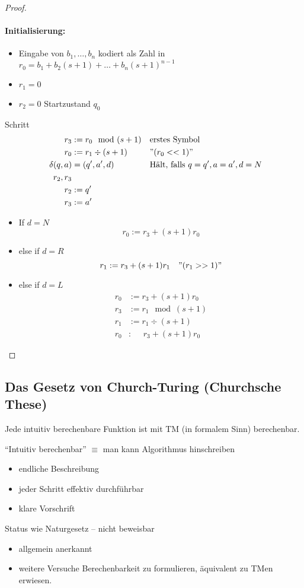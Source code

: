 \begin{proof}
	\paragraph{Initialisierung:}
	\begin{itemize}[label=\textbullet]
		\item Eingabe von $b_1,\dots,b_n$ kodiert als Zahl in $r_0=b_1+b_2(s+1)+\dots+b_n(s+1)^{n-1}$
		\item $r_1=0$
		\item $r_2=0$ Startzustand $q_0$
	\end{itemize}
	Schritt
	\begin{align*}
		r_3 &:= r_0 \mod(s+1) &&\text{erstes Symbol}\\
		r_0 &:= r_1 \div(s+1) &&"(r_0<<1)"\\
		\delta(q,a) &= (q',a',d) &&\text{Hält, falls }q=q',a=a',d=N\\
		\phantom{\delta(}r_2,r_3\\
		r_2 &:= q'\\
		r_3 &:= a'
	\end{align*}
	\begin{itemize}
		\item If $d=N$
		\[ r_0 := r_3+(s+1)r_0 \]
		\item else if $d=R$
		\[ r_1 := r_3+(s+1)r_1 \quad "(r_1>>1)" \]
		\item else if $d=L$
		\begin{align*}
			r_0 &:= r_3+(s+1)r_0\\
			r_3 &:= r_1\mod(s+1)\\
			r_1 &:= r_1\div(s+1)\\
			r_0 &:\phantom{=} r_3+(s+1)r_0
		\end{align*}
	\end{itemize}
\end{proof}

\subsection{Das Gesetz von Church-Turing (Churchsche These)} %
\begin{Satz}[name={[Intuitiv berechenbare Funktionen sind mit \acs*{TM} berechenbar]}]
	Jede intuitiv berechenbare Funktion ist mit \ac{TM} (in formalem Sinn) berechenbar.
	
	"`Intuitiv berechenbar"' $\equiv$ man kann Algorithmus hinschreiben
	\begin{itemize}
		\item endliche Beschreibung
		\item jeder Schritt effektiv durchführbar
		\item klare Vorschrift
	\end{itemize}
	Status wie Naturgesetz -- nicht beweisbar
	\begin{itemize}[label=\->]
		\item allgemein anerkannt
		\item weitere Versuche Berechenbarkeit zu formulieren, äquivalent zu \ac{TM}en erwiesen.
	\end{itemize}
\end{Satz}
